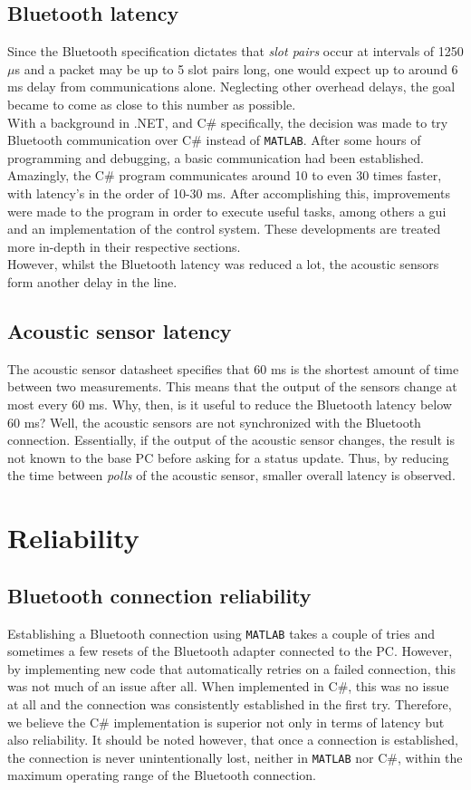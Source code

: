 \documentclass[11pt,titlepage]{report}
\begin{document}
\subsection{Bluetooth latency}
Since the Bluetooth specification dictates that \textit{slot pairs} occur at intervals of 1250$\mu$s and a packet may be up to 5 slot pairs long, one would expect up to around 6 ms delay from communications alone. Neglecting other overhead delays, the goal became to come as close to this number as possible. \\
With a background in .NET, and C\# specifically, the decision was made to try Bluetooth communication over C\# instead of \texttt{MATLAB}. After some hours of programming and debugging, a basic communication had been established. Amazingly, the C\# program communicates around 10 to even 30 times faster, with latency's in the order of 10-30 ms. After accomplishing this, improvements were made to the program in order to execute useful tasks, among others a gui and an implementation of the control system. These developments are treated more in-depth in their respective sections.\\
However, whilst the Bluetooth latency was reduced a lot, the acoustic sensors form another delay in the line.
\subsection{Acoustic sensor latency}
The acoustic sensor datasheet specifies that 60 ms is the shortest amount of time between two measurements. This means that the output of the sensors change at most every 60 ms. Why, then, is it useful to reduce the Bluetooth latency below 60 ms? Well, the acoustic sensors are not synchronized with the Bluetooth connection. Essentially, if the output of the acoustic sensor changes, the result is not known to the base PC before asking for a status update. Thus, by reducing the time between \textit{polls} of the acoustic sensor, smaller overall latency is observed.

\section{Reliability}
\subsection{Bluetooth connection reliability}
Establishing a Bluetooth connection using \texttt{MATLAB} takes a couple of tries and sometimes a few resets of the Bluetooth adapter connected to the PC. However, by implementing new code that automatically retries on a failed connection, this was not much of an issue after all. When implemented in C\#, this was no issue at all and the connection was consistently established in the first try. Therefore, we believe the C\# implementation is superior not only in terms of latency but also reliability. It should be noted however, that once a connection is established, the connection is never unintentionally lost, neither in \texttt{MATLAB} nor C\#, within the maximum operating range of the Bluetooth connection.
\end{document}
